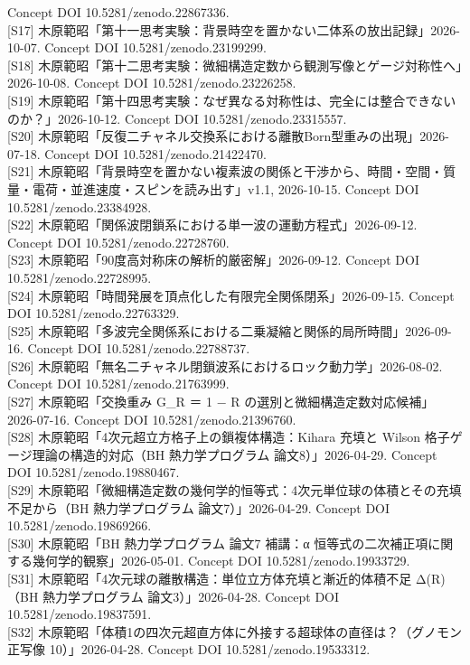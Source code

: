 \documentclass[
  a4paper,
]{ltjsarticle}
\begin{document}
Concept DOI 10.5281/zenodo.22867336.\\
{[}S17{]}
木原範昭「第十一思考実験：背景時空を置かない二体系の放出記録」2026-10-07.
Concept DOI 10.5281/zenodo.23199299.\\
{[}S18{]}
木原範昭「第十二思考実験：微細構造定数から観測写像とゲージ対称性へ」2026-10-08.
Concept DOI 10.5281/zenodo.23226258.\\
{[}S19{]}
木原範昭「第十四思考実験：なぜ異なる対称性は、完全には整合できないのか？」2026-10-12.
Concept DOI 10.5281/zenodo.23315557.\\
{[}S20{]}
木原範昭「反復二チャネル交換系における離散Born型重みの出現」2026-07-18.
Concept DOI 10.5281/zenodo.21422470.\\
{[}S21{]}
木原範昭「背景時空を置かない複素波の関係と干渉から、時間・空間・質量・電荷・並進速度・スピンを読み出す」v1.1,
2026-10-15. Concept DOI 10.5281/zenodo.23384928.\\
{[}S22{]} 木原範昭「関係波閉鎖系における単一波の運動方程式」2026-09-12.
Concept DOI 10.5281/zenodo.22728760.\\
{[}S23{]} 木原範昭「90度高対称床の解析的厳密解」2026-09-12. Concept DOI
10.5281/zenodo.22728995.\\
{[}S24{]} 木原範昭「時間発展を頂点化した有限完全関係閉系」2026-09-15.
Concept DOI 10.5281/zenodo.22763329.\\
{[}S25{]}
木原範昭「多波完全関係系における二乗凝縮と関係的局所時間」2026-09-16.
Concept DOI 10.5281/zenodo.22788737.\\
{[}S26{]}
木原範昭「無名二チャネル閉鎖波系におけるロック動力学」2026-08-02.
Concept DOI 10.5281/zenodo.21763999.\\
{[}S27{]} 木原範昭「交換重み G\_R ＝ 1 − R
の選別と微細構造定数対応候補」2026-07-16. Concept DOI
10.5281/zenodo.21396760.\\
{[}S28{]} 木原範昭「4次元超立方格子上の鎖複体構造：Kihara 充填と Wilson
格子ゲージ理論の構造的対応（BH 熱力学プログラム 論文8）」2026-04-29.
Concept DOI 10.5281/zenodo.19880467.\\
{[}S29{]}
木原範昭「微細構造定数の幾何学的恒等式：4次元単位球の体積とその充填不足から（BH
熱力学プログラム 論文7）」2026-04-29. Concept DOI
10.5281/zenodo.19869266.\\
{[}S30{]} 木原範昭「BH 熱力学プログラム 論文7 補講：α
恒等式の二次補正項に関する幾何学的観察」2026-05-01. Concept DOI
10.5281/zenodo.19933729.\\
{[}S31{]} 木原範昭「4次元球の離散構造：単位立方体充填と漸近的体積不足
Δ(R)（BH 熱力学プログラム 論文3）」2026-04-28. Concept DOI
10.5281/zenodo.19837591.\\
{[}S32{]}
木原範昭「体積1の四次元超直方体に外接する超球体の直径は？（グノモン正写像
10）」2026-04-28. Concept DOI 10.5281/zenodo.19533312.
\end{document}
